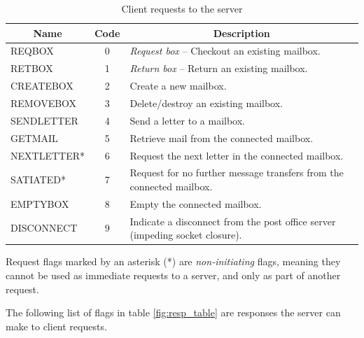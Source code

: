 \documentclass[10pt]{report}
\begin{document}
\begin{table}[h]
	\centering
	\caption{Client requests to the server}
	\begin{tabular}{|l|c|p{11cm}|}
		\hline\multicolumn{1}{|c|}{\bfseries Name} & \multicolumn{1}{|c|}{\bfseries Code} & \multicolumn{1}{|c|}{\bfseries Description} \\ \hline
		REQBOX & 0 & \emph{Request box} -- Checkout an existing mailbox.\\ \hline
		RETBOX & 1 & \emph{Return box} -- Return an existing mailbox.\\ \hline
		CREATEBOX & 2 & Create a new mailbox.\\ \hline
		REMOVEBOX & 3 & Delete/destroy an existing mailbox.\\ \hline
		SENDLETTER & 4 & Send a letter to a mailbox.\\ \hline
		GETMAIL & 5 & Retrieve mail from the connected mailbox.\\ \hline
		NEXTLETTER* & 6 & Request the next letter in the connected mailbox.\\ \hline
		SATIATED* & 7 & Request for no further message transfers from the connected mailbox.\\ \hline
		EMPTYBOX & 8 & Empty the connected mailbox.\\ \hline
		DISCONNECT & 9 & Indicate a disconnect from the post office server (impeding socket closure).\\ \hline
	\end{tabular}
	\label{fig:req_table}
\end{table}

Request flags marked by an asterisk (*) are \emph{non-initiating} flags, meaning they cannot be used as immediate requests to a server, and only as part of another request.

The following list of flags in table \ref{fig:resp_table} are responses the server can make to client requests.
\end{document}
